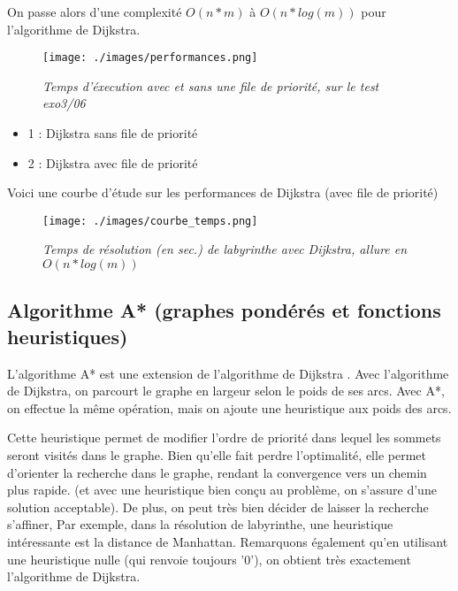 \documentclass[10pt]{article}
\begin{document}
				On passe alors d'une complexité \(O(n * m)\) à \(O(n * log(m))\) pour l'algorithme de Dijkstra.

				\begin{figure}[H]
					\begin{center}
						\texttt{[image: ./images/performances.png]}
					\end{center}
					\caption{\textit{Temps d'éxecution avec et sans une file de priorité, sur le test exo3/06}}
				\end{figure}
				
				\begin{itemize}[label=-]
					\setlength\itemsep{0.1em}
					\item 1 : Dijkstra sans file de priorité
					\item 2 : Dijkstra avec file de priorité
				\end{itemize}

				Voici une courbe d'étude sur les performances de Dijkstra (avec file de priorité)
				\begin{figure}[H]
					\begin{center}
						\texttt{[image: ./images/courbe\_temps.png]}
					\end{center}
					\caption{\textit{Temps de résolution (en sec.) de labyrinthe avec Dijkstra, allure en \(O(n * log(m))\)}}
					\label{courbe_temps}
				\end{figure}

		\subsection{Algorithme A* (graphes pondérés et fonctions heuristiques)}
			L'algorithme A* est une extension de l'algorithme de Dijkstra \cite{computerphile_maze} \cite{computerphile_astar}.
			Avec l'algorithme de Dijkstra, on parcourt le graphe en largeur selon le poids de ses arcs.
			Avec A*, on effectue la même opération, mais on ajoute une heuristique \cite{heuristique} aux poids des arcs.\newline
			
			Cette heuristique permet de modifier l'ordre de priorité dans lequel les sommets seront visités dans le graphe.
			Bien qu'elle fait perdre l'optimalité, elle permet d'orienter la recherche dans le graphe, rendant la convergence vers
			un chemin plus rapide. (et avec une heuristique bien conçu au problème, on s'assure d'une solution acceptable).
			De plus, on peut très bien décider de laisser la recherche s'affiner, 
			Par exemple, dans la résolution de labyrinthe, une heuristique intéressante est la distance de Manhattan. \cite{manhattan}			
			Remarquons également qu'en utilisant une heuristique nulle (qui renvoie toujours '0'),
			on obtient très exactement l'algorithme de Dijkstra.
\end{document}
